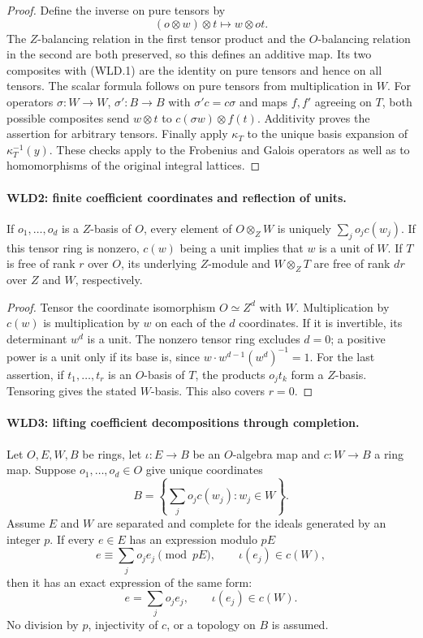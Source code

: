 \begin{proof}
Define the inverse on pure tensors by
\[
             (o\otimes w)\otimes t\longmapsto w\otimes ot.
\]
The $Z$-balancing relation in the first tensor product and the
$O$-balancing relation in the second are both preserved, so this
defines an additive map. Its two composites with (WLD.1) are the
identity on pure tensors and hence on all tensors. The scalar
formula follows on pure tensors from multiplication in $W$.
For operators $\sigma:W\to W$, $\sigma':B\to B$ with
$\sigma'c=c\sigma$ and maps $f,f'$ agreeing on $T$, both possible
composites send $w\otimes t$ to $c(\sigma w)\otimes f(t)$.
Additivity proves the assertion for arbitrary tensors. Finally apply
$\kappa_T$ to the unique basis expansion of $\kappa_T^{-1}(y)$.
These checks apply to the Frobenius and Galois operators as well as
to homomorphisms of the original integral lattices.
\end{proof}

\paragraph{WLD2: finite coefficient coordinates and reflection of units.}
\label{claim:WLD2}
If $o_1,\ldots,o_d$ is a $Z$-basis of $O$, every element of
$O\otimes_ZW$ is uniquely $\sum_j o_jc(w_j)$. If this tensor ring
is nonzero, $c(w)$ being a unit implies that $w$ is a unit of $W$.
If $T$ is free of rank $r$ over $O$, its underlying $Z$-module and
$W\otimes_ZT$ are free of rank $dr$ over $Z$ and $W$, respectively.

\begin{proof}
Tensor the coordinate isomorphism $O\simeq Z^d$ with $W$.
Multiplication by $c(w)$ is multiplication by $w$ on each of the $d$
coordinates. If it is invertible, its determinant $w^d$ is a unit.
The nonzero tensor ring excludes $d=0$; a positive power is a unit
only if its base is, since $w\cdot w^{d-1}(w^d)^{-1}=1$.
For the last assertion, if $t_1,\ldots,t_r$ is an $O$-basis of $T$,
the products $o_jt_k$ form a $Z$-basis. Tensoring gives the stated
$W$-basis. This also covers $r=0$.
\end{proof}

\paragraph{WLD3: lifting coefficient decompositions through completion.}
\label{claim:WLD3}
Let $O,E,W,B$ be rings, let $\iota:E\to B$ be an $O$-algebra map
and $c:W\to B$ a ring map. Suppose $o_1,\ldots,o_d\in O$ give
unique coordinates
\[
                       B=\left\{\sum_j o_jc(w_j):w_j\in W\right\}.
\]
Assume $E$ and $W$ are separated and complete for the ideals generated
by an integer $p$. If every $e\in E$ has an expression modulo $pE$
\[
 e\equiv\sum_j o_je_j\pmod {pE},\qquad \iota(e_j)\in c(W),
\]
then it has an exact expression of the same form:
\[
                  e=\sum_j o_je_j,\qquad \iota(e_j)\in c(W).
                                                               \tag{WLD.3}
\]
No division by $p$, injectivity of $c$, or a topology on $B$ is assumed.

